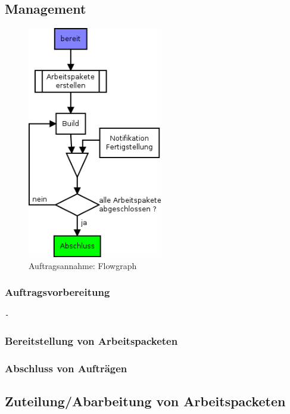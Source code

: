 \subsection{Management}

\begin{figure}[ht] 
  \label{fig:lebenszyklus-auftrag-abarbeitung}
  \begin{center}
      \includegraphics[height=4in]{imageinput/lebenszyklus-auftrag-abarbeitung.png}
  \end{center}
  \caption{Auftragsannahme: Flowgraph}
\end{figure}

\subsubsection{Auftragsvorbereitung}

\begin{verbatim}
- 
\end{verbatim}


\subsubsection{Bereitstellung von Arbeitspacketen}
\subsubsection{Abschluss von Auftr\"agen}


\subsection{Zuteilung/Abarbeitung von Arbeitspacketen}


